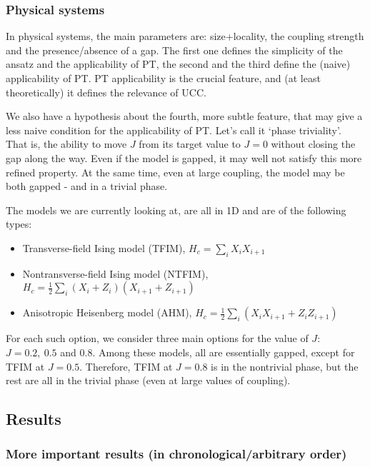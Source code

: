 \documentclass[10pt, a4paper]{article}
\begin{document}
\subsubsection*{Physical systems}

In physical systems, the main parameters are: size+locality, the coupling strength and the presence/absence of a gap. The first one defines the simplicity of the ansatz and the applicability of PT, the second and the third define the (naive) applicability of PT. PT applicability is the crucial feature, and (at least theoretically) it defines the relevance of UCC.

We also have a hypothesis about the fourth, more subtle feature, that may give a less naive condition for the applicability of PT. Let's call it `phase triviality'. That is, the ability to move $J$ from its target value to $J=0$ without closing the gap along the way. Even if the model is gapped, it may well not satisfy this more refined property. At the same time, even at large coupling, the model may be both gapped - and in a trivial phase.

The models we are currently looking at, are all in 1D and are of the following types:
\begin{itemize}
\item Transverse-field Ising model (TFIM), $H_c=\sum_i X_i X_{i+1}$
\item Nontransverse-field Ising model (NTFIM), $H_c=\frac{1}{2}\sum_i (X_i+Z_i) (X_{i+1}+Z_{i+1})$
\item Anisotropic Heisenberg model (AHM),  $H_c=\frac{1}{2}\sum_i (X_iX_{i+1}+Z_iZ_{i+1})$
\end{itemize}

For each such option, we consider three main options for the value of $J$: $J=0.2,~0.5$ and $0.8$. Among these models, all are essentially gapped, except for TFIM at $J=0.5$. Therefore, TFIM at $J=0.8$ is in the nontrivial phase, but the rest are all in the trivial phase (even at large values of coupling).

\subsection*{Results}
\subsubsection*{More important results (in chronological/arbitrary order)}
\end{document}
